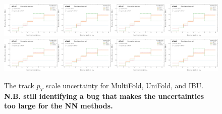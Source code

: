\begin{figure}[h!]
\includegraphics[width=0.25\textwidth,page=12]{figures/SimResults/TrackJet_SystEffect.pdf}\includegraphics[width=0.25\textwidth,page=16]{figures/SimResults/TrackJet_SystEffect.pdf}\includegraphics[width=0.25\textwidth,page=44]{figures/SimResults/TrackJet_SystEffect.pdf}\includegraphics[width=0.25\textwidth,page=48]{figures/SimResults/TrackJet_SystEffect.pdf}\\
\includegraphics[width=0.25\textwidth,page=52]{figures/SimResults/TrackJet_SystEffect.pdf}\includegraphics[width=0.25\textwidth,page=56]{figures/SimResults/TrackJet_SystEffect.pdf}\includegraphics[width=0.25\textwidth,page=60]{figures/SimResults/TrackJet_SystEffect.pdf}\includegraphics[width=0.25\textwidth,page=64]{figures/SimResults/TrackJet_SystEffect.pdf}
\caption{The track $p_T$ scale uncertainty for MultiFold, UniFold, and IBU.  \textbf{N.B. still identifying a bug that makes the uncertainties too large for the NN methods.}}
\label{fig:simresultsmulti_trackjetuncertsl4}
\end{figure}

